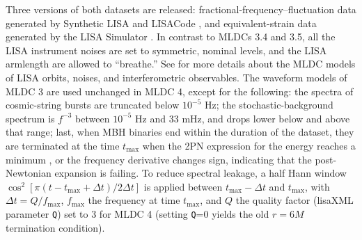\documentclass{iopart}
\begin{document}
Three versions of both datasets are released: fractional-frequency--fluctuation data generated by Synthetic LISA \cite{synthlisa} and LISACode \cite{lisacode}, and equivalent-strain data generated by the LISA Simulator \cite{lisasimulator}. In contrast to MLDCs 3.4 and 3.5, all the LISA instrument noises are set to symmetric, nominal levels, and the LISA armlength are allowed to ``breathe.'' See \cite{mldcgwdaw2,MLDC3} for more details about the MLDC models of LISA orbits, noises, and interferometric observables. The waveform models of MLDC 3 \cite{MLDC3} are used unchanged in MLDC 4, except for the following: the spectra of cosmic-string bursts are truncated below $10^{-5}$ Hz; the stochastic-background spectrum is $f^{-3}$ between $10^{-5}$ Hz and 33 mHz, and drops lower below and above that range; last, 
when MBH binaries end within the duration of the dataset,
they are terminated at the time $t_\mathrm{max}$ when
the 2PN expression for the energy reaches a minimum \cite{bcv2}, or the frequency derivative changes sign, indicating that the post-Newtonian expansion is failing.
To reduce spectral leakage, a half Hann window $\cos^2[\pi (t - t_\mathrm{max} + \Delta t) / 2 \Delta t]$ is applied between $t_\mathrm{max} - \Delta t$ and $t_\mathrm{max}$, with $\Delta t = Q/f_\mathrm{max}$, $f_\mathrm{max}$ the frequency at time $t_\mathrm{max}$, and $Q$ the quality factor (lisaXML parameter \texttt{Q}) set to 3 for MLDC 4 (setting \texttt{Q}=0 yields the old $r = 6M$ termination condition).
%
\end{document}
